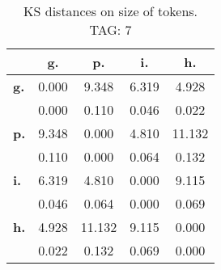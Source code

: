 \begin{table}[h!]
\begin{center}
\begin{tabular}{| l || c | c | c | c |}\hline
 & {\bf g.} & {\bf p.} & {\bf i.} & {\bf h.} \\\hline\hline
{\bf g.} & 0.000 & 9.348 & 6.319 & 4.928 \\
{\bf } & 0.000 & 0.110 & 0.046 & 0.022 \\\hline
{\bf p.} & 9.348 & 0.000 & 4.810 & 11.132 \\
{\bf } & 0.110 & 0.000 & 0.064 & 0.132 \\\hline
{\bf i.} & 6.319 & 4.810 & 0.000 & 9.115 \\
{\bf } & 0.046 & 0.064 & 0.000 & 0.069 \\\hline
{\bf h.} & 4.928 & 11.132 & 9.115 & 0.000 \\
{\bf } & 0.022 & 0.132 & 0.069 & 0.000 \\\hline
\end{tabular}
\caption{KS distances on size of tokens. TAG: 7}
\end{center}
\end{table}
